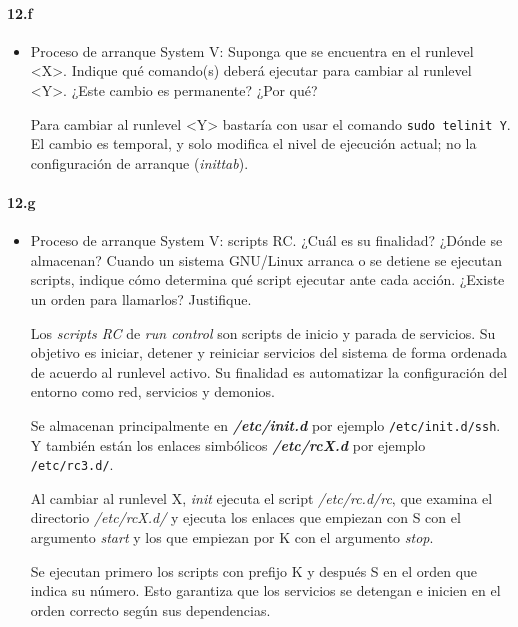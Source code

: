 \documentclass[10pt,a4paper]{paper}
\begin{document}
\paragraph{12.f}
\begin{itemize}
	
	\item {Proceso de arranque System V:} Suponga que se encuentra en el runlevel <X>. Indique qué comando(s) deberá ejecutar para cambiar al runlevel <Y>. ¿Este cambio es permanente? ¿Por qué?
	
	Para cambiar al runlevel <Y> bastaría con usar el comando \texttt{sudo telinit Y}. El cambio es temporal, y solo modifica el nivel de ejecución actual; no la configuración de arranque (\textit{inittab}).

	
\end{itemize}

	
	
	
	

\paragraph{12.g}
\begin{itemize}
	
	\item {Proceso de arranque System V:} scripts RC. ¿Cuál es su finalidad? ¿Dónde se almacenan? Cuando un sistema GNU/Linux arranca o se detiene se ejecutan scripts, indique cómo determina qué script ejecutar ante cada acción. ¿Existe un orden para llamarlos? Justifique.
	
	Los \textit{scripts RC} de \textit{run control} son scripts de inicio y parada de servicios. Su objetivo es iniciar, detener y reiniciar servicios del sistema de forma ordenada de acuerdo al runlevel activo. Su finalidad es automatizar la configuración  del entorno como red, servicios y demonios.
	
	Se almacenan principalmente en \textit{\textbf{/etc/init.d}} por ejemplo \texttt{/etc/init.d/ssh}. Y también están los enlaces simbólicos \textit{\textbf{/etc/rcX.d}} por ejemplo \texttt{/etc/rc3.d/}.
	
	Al cambiar al runlevel X, \textit{init} ejecuta el script \textit{/etc/rc.d/rc}, que examina el directorio \textit{/etc/rcX.d/} y ejecuta los enlaces que empiezan con S con el argumento \textit{start} y los que empiezan por K con el argumento \textit{stop}.
	
	Se ejecutan primero los scripts con prefijo K y después S en el orden que indica su número. Esto garantiza que los servicios se detengan e inicien en el orden correcto según sus dependencias.
	
	
	
	
\end{itemize}
\end{document}
